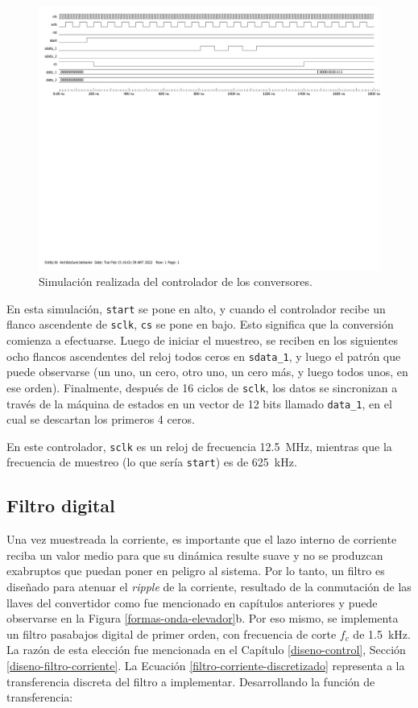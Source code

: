 \begin{figure}[hbt!]
    \centering
    \includegraphics[width=0.85\columnwidth]{Imágenes/Conversor analógico-digital/Test bench.pdf}
    \caption{Simulación realizada del controlador de los conversores.}
    \label{adc-controller}
\end{figure} 

En esta simulación, \texttt{start} se pone en alto, y cuando el controlador recibe un flanco ascendente de \texttt{sclk}, \texttt{cs} se pone en bajo. Esto significa que la conversión comienza a efectuarse. Luego de iniciar el muestreo, se reciben en los siguientes ocho flancos ascendentes del reloj todos ceros en \texttt{sdata\_1}, y luego el patrón que puede observarse (un uno, un cero, otro uno, un cero más, y luego todos unos, en ese orden). Finalmente, después de 16 ciclos de \texttt{sclk}, los datos se sincronizan a través de la máquina de estados en un vector de 12 bits llamado \texttt{data\_1}, en el cual se descartan los primeros 4 ceros.

En este controlador, \texttt{sclk} es un reloj de frecuencia \SI{12.5}{\mega\hertz}, mientras que la frecuencia de muestreo (lo que sería \texttt{start}) es de \SI{625}{\kilo\hertz}. 

\subsection{Filtro digital}

Una vez muestreada la corriente, es importante que el lazo interno de corriente reciba un valor medio para que su dinámica resulte suave y no se produzcan exabruptos que puedan poner en peligro al sistema. Por lo tanto, un filtro es diseñado para atenuar el \emph{ripple} de la corriente, resultado de la conmutación de las llaves del convertidor como fue mencionado en capítulos anteriores y puede observarse en la Figura \ref{formas-onda-elevador}b. Por eso mismo, se implementa un filtro pasabajos digital de primer orden, con frecuencia de corte $f_c$ de \SI{1.5}{\kilo\hertz}. La razón de esta elección fue mencionada en el Capítulo \ref{diseno-control}, Sección \ref{diseno-filtro-corriente}. La Ecuación \ref{filtro-corriente-discretizado} representa a la transferencia discreta del filtro a implementar. Desarrollando la función de transferencia:

